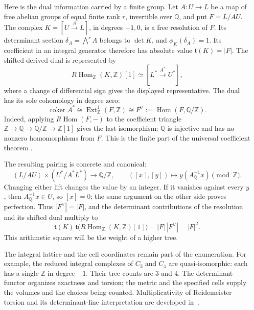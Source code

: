 \documentclass[11pt]{article}
\theoremstyle{definition}
\theoremstyle{remark}
\newcommand{\Q}{\mathbb Q}
\newcommand{\Z}{\mathbb Z}
\begin{document}
Here is the dual information carried by a finite group. Let
\(A:U\to L\) be a map of free abelian groups of equal finite rank \(r\), invertible
over \(\Q\), and put \(F=L/AU\). The complex
\(K=[U\xrightarrow{A}L]\), in degrees \(-1,0\), is a free resolution
of \(F\). Its determinant section \(\delta_A=\bigwedge^r A\) belongs
to \(\det K\), and \(\phi_K(\delta_A)=1\). Its coefficient in an
integral generator therefore has absolute value
\(\mathfrak t(K)=|F|\). The shifted derived dual is represented by
\[
 R\operatorname{Hom}_{\Z}(K,\Z)[1]
 \simeq[L^*\xrightarrow{A^*}U^*],
\]
where a change of differential sign gives the displayed representative.
The dual has its sole cohomology in degree zero:
\begin{equation}\label{eq:derived-finite-dual}
 \operatorname{coker}A^*
 \cong\operatorname{Ext}^1_{\Z}(F,\Z)
 \cong F^\vee:=\operatorname{Hom}(F,\Q/\Z).
\end{equation}
Indeed, applying \(R\operatorname{Hom}(F,-)\) to the coefficient
triangle \(\Z\to\Q\to\Q/\Z\to\Z[1]\) gives the last isomorphism:
\(\Q\) is injective and has no nonzero homomorphisms from \(F\).
This is the finite part of the universal coefficient theorem
\cite{derived-hatcher-uct}.

The resulting pairing is concrete and canonical:
\[
 (L/AU)\times(U^*/A^*L^*)\longrightarrow\Q/\Z,
 \qquad ([x],[y])\longmapsto y(A_{\Q}^{-1}x)\pmod\Z.
\]
Changing either lift changes the value by an integer. If it vanishes
against every \(y\), then \(A_{\Q}^{-1}x\in U\), so \([x]=0\);
the same argument on the other side proves perfection. Thus
\(|F^\vee|=|F|\), and the determinant contributions of the resolution
and its shifted dual multiply to
\begin{equation}\label{eq:derived-torsion-square}
 \mathfrak t(K)\,
 \mathfrak t\bigl(R\operatorname{Hom}_{\Z}(K,\Z)[1]\bigr)
   =|F|\,|F^\vee|=|F|^2.
\end{equation}
This arithmetic square will be the weight of a higher tree.

The integral lattice and the cell coordinates remain part of the
enumeration. For example, the reduced integral complexes of \(C_3\)
and \(C_4\) are quasi-isomorphic: each has a single \(\Z\) in degree
\(-1\). Their tree counts are \(3\) and \(4\). The determinant functor
organizes exactness and torsion; the metric and the specified cells
supply the volumes and the choices being counted. Multiplicativity of
Reidemeister torsion and its determinant-line interpretation are
developed in~\cite{derived-mnev-torsions}.
\end{document}
